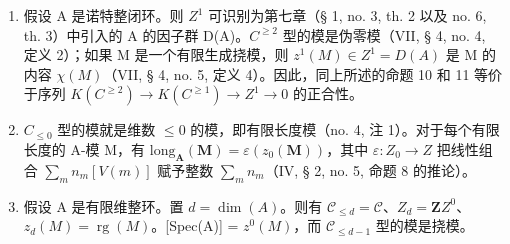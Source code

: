 \begin{enumerate}
\def\labelenumi{\arabic{enumi})}
\setcounter{enumi}{1}
\item
  假设 A 是诺特整闭环。则 \(Z^1\) 可识别为第七章（§ 1, no. 3, th. 2 以及 no. 6, th. 3）中引入的 A 的因子群 D(A)。\(C^{\geqslant 2}\) 型的模是伪零模（VII, § 4, no. 4, 定义 2）；如果 M 是一个有限生成挠模，则 \(z^1(M) \in Z^1 = D(A)\) 是 M 的内容 \(\chi(M)\)（VII, § 4, no. 5, 定义 4）。因此，同上所述的命题 10 和 11 等价于序列 \(K(C^{\geqslant 2}) \to K(C^{\geqslant 1}) \to Z^1 \to 0\) 的正合性。
\item
  \(C_{\leqslant0}\) 型的模就是维数 \(\leqslant0\) 的模，即有限长度模（no. 4, 注 1）。对于每个有限长度的 A-模 M，有 \(\text{long}_{\mathbf{A}}(\mathbf{M}) = \varepsilon(z_0(\mathbf{M}))\)，其中 \(\varepsilon: Z_0 \to Z\) 把线性组合 \(\sum_{m} n_{m}[V(m)]\) 赋予整数 \(\sum_{m} n_{m}\)（IV, § 2, no. 5, 命题 8 的推论）。
\item
  假设 A 是有限维整环。置 \(d = \dim(A)\)。则有 \(\mathcal{C}_{\leq d} = \mathcal{C}\)、\(Z_d = \mathbf{Z}\){}{}\(Z^0\)、\(z_d(M) = \operatorname{rg}(M)\)。[Spec(A)] = \(z^0(M)\)，而 \(\mathcal{C}_{\leq d-1}\) 型的模是挠模。
\end{enumerate}


